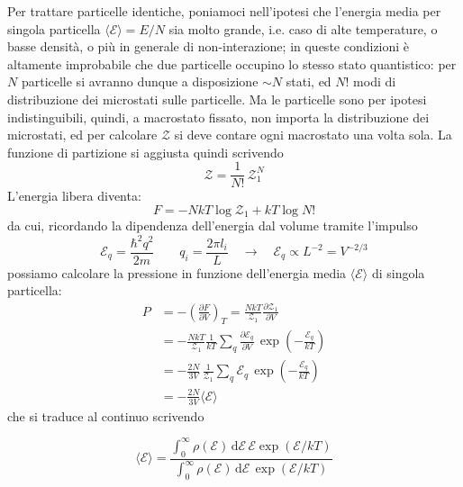 \documentclass[a4paper]{report}
\newcommand\ddfrac[2]{\frac{\displaystyle #1}{\displaystyle #2}}
\begin{document}
Per trattare particelle identiche, poniamoci nell'ipotesi che l'energia media per singola particella $\langle \mathcal{E}\rangle = E/N$ sia molto grande, i.e. caso di alte temperature, o basse densità, o più in generale di non-interazione; in queste condizioni è altamente improbabile che due particelle occupino lo stesso stato quantistico: per $N$ particelle si avranno dunque a disposizione $\sim N$ stati, ed $N!$ modi di distribuzione dei microstati sulle particelle. Ma le particelle sono per ipotesi indistinguibili, quindi, a macrostato fissato, non importa la distribuzione dei microstati, ed per calcolare $\mathcal{Z}$ si deve contare ogni macrostato una volta sola. La funzione di partizione si aggiusta quindi scrivendo
\begin{equation}
    \mathcal{Z} = \frac{1}{N!}\,\mathcal{Z}_1^N
\end{equation}
L'energia libera diventa:
\begin{equation}
    F = -N k T \log \mathcal{Z}_1 + k T \log N!
\end{equation}
da cui, ricordando la dipendenza dell'energia dal volume tramite l'impulso
\begin{equation}
    \mathcal{E}_q = \frac{\hbar^2 q^2}{2 m} \qquad q_i = \frac{2 \pi l_i}{L} \quad \rightarrow \quad \mathcal{E}_q \propto L^{-2} = V^{-2/3}
\end{equation}
possiamo calcolare la pressione in funzione dell'energia media $\langle\mathcal{E}\rangle$ di singola particella:
\begin{equation}
    \begin{split}
        P & = -\left(\frac{\partial F}{\partial V}\right)_T = \frac{N k T}{\mathcal{Z}_1}\frac{\partial\mathcal{Z}_1}{\partial V} \\
        & = -\frac{N k T}{\mathcal{Z}_1}\frac{1}{k T}\sum_{q}\frac{\partial \mathcal{E}_{q}}{\partial V}\,\exp\left(-\frac{\mathcal{E}_{q}}{k T}\right) \\
        & = - \frac{2 N}{3 V} \, \frac{1}{\mathcal{Z}_1}\sum_{q}\mathcal{E}_{q}\,\exp\left(-\frac{\mathcal{E}_{q}}{k T}\right) \\
        & = -\frac{2 N}{3 V} \langle\mathcal{E}\rangle
    \end{split}
\end{equation}
che si traduce al continuo scrivendo

\begin{equation}
    \langle \mathcal{E} \rangle = \ddfrac{\int_0^\infty \rho(\mathcal{E})\, \mathrm{d}\mathcal{E}\,\mathcal{E}\exp(\mathcal{E}/kT)}{\int_0^\infty \rho(\mathcal{E})\, \mathrm{d}\mathcal{E}\,\exp(\mathcal{E}/kT)}
\end{equation}
\end{document}
